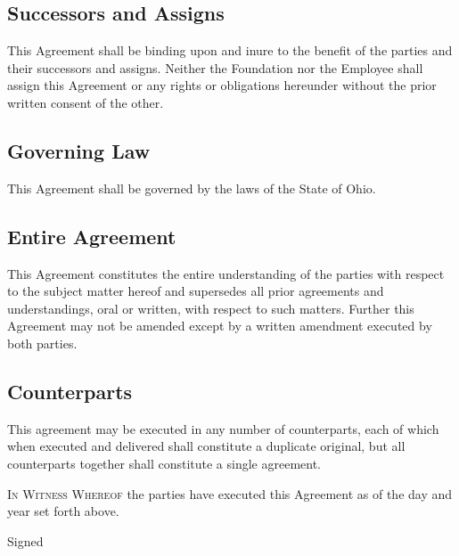 \documentclass{ross}
\begin{document}
\subsection{Successors and Assigns}

This Agreement shall be binding upon and inure to the benefit of the parties 
and their successors and assigns. Neither the Foundation nor the Employee shall 
assign this Agreement or any rights or obligations hereunder without the prior 
written consent of the other.

\subsection{Governing Law}

This Agreement shall be governed by the laws of the State of Ohio.

\subsection{Entire Agreement}

This Agreement constitutes the entire understanding of the parties with respect to 
the subject matter hereof and supersedes all prior agreements and understandings, 
oral or written, with respect to such matters.  Further this Agreement may not be 
amended except by a written amendment executed by both parties.

\subsection{Counterparts}

This agreement may be executed in any number of counterparts, each of which when 
executed and delivered shall constitute a duplicate original, but all counterparts 
together shall constitute a single agreement.

\textsc{In Witness Whereof} the parties have executed this Agreement as of the 
day and year set forth above.

\vspace{0.75in}
\hfill Signed 

\vspace{0.5in}
\hfill  {}

   
\end{document}
